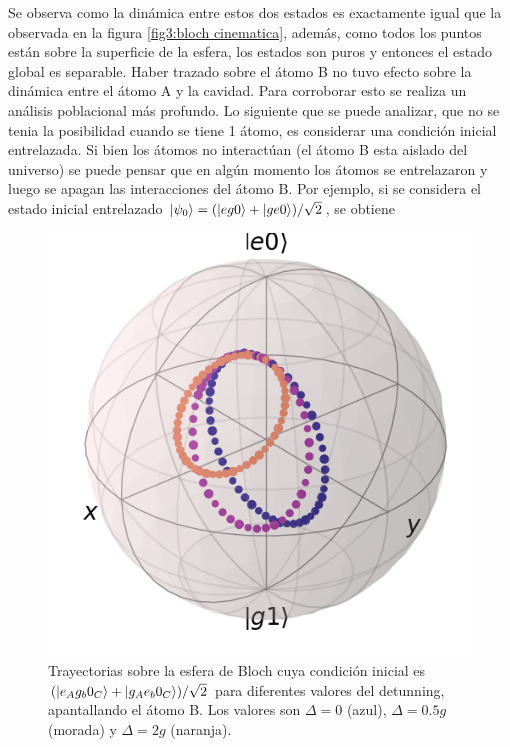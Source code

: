 Se observa como la dinámica entre estos dos estados es exactamente igual que la observada en la figura \ref{fig3:bloch cinematica}, además, como todos los puntos están sobre la superficie de la esfera, los estados son puros y entonces el estado global es separable. Haber trazado sobre el átomo B no tuvo efecto sobre la dinámica entre el átomo A y la cavidad. Para corroborar esto se realiza un análisis poblacional más profundo.
Lo siguiente que se puede analizar, que no se tenia la posibilidad cuando se tiene 1 átomo, es considerar una condición inicial entrelazada. Si bien los átomos no interactúan (el átomo B esta aislado del universo) se puede pensar que en algún momento los átomos se entrelazaron y luego se apagan las interacciones del átomo B. Por ejemplo, si se considera el estado inicial entrelazado $\ket{\psi_0}=(\ket{eg0}+\ket{ge0})/\sqrt{2}$, se obtiene 
\begin{figure}[H]
    \begin{minipage}[c]{0.67\textwidth}
        \includegraphics[width=\textwidth]{figuras/ch4/bloch eg0+ge0 bloch AC a=0 d=2.0 x=0.0 k=0.0 J=0.0 gamma=0.0 p=0.0.png}
    \end{minipage}\hfill
    \begin{minipage}[c]{0.3\textwidth}
        \caption{Trayectorias sobre la esfera de Bloch cuya condición inicial es $(\ket{e_Ag_b0_C}+\ket{g_Ae_b0_C})/\sqrt{2}$ para diferentes valores del detunning, apantallando el átomo B. Los valores son $\Delta=0$ (azul), $\Delta=0.5g$ (morada) y $\Delta=2g$ (naranja).}
    \end{minipage}
    \label{fig4:bloch delta eg0 sim}
\end{figure}
